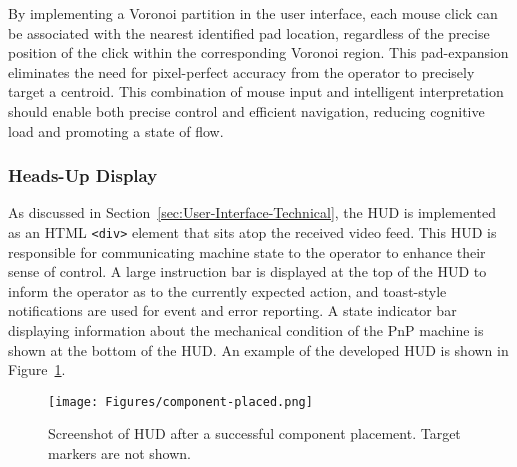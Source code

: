 \documentclass[12pt,british,UKenglish]{article}
\begin{document}
By implementing a Voronoi partition in the user interface, each mouse click can be associated with the nearest identified pad location, regardless of the precise position of the click within the corresponding Voronoi region.
This pad-expansion eliminates the need for pixel-perfect accuracy from the operator to precisely target a centroid.
This combination of mouse input and intelligent interpretation should enable both precise control and efficient navigation, reducing cognitive load and promoting a state of flow.

\subsubsection{Heads-Up Display}

As discussed in Section~\ref{sec:User-Interface-Technical}, the \ac{HUD} is implemented as an \ac{HTML} \texttt{<div>} element that sits atop the received video feed.
This \ac{HUD} is responsible for communicating machine state to the operator to enhance their sense of control.
A large instruction bar is displayed at the top of the \ac{HUD} to inform the operator as to the currently expected action, and toast-style notifications are used for event and error reporting.
A state indicator bar displaying information about the mechanical condition of the \ac{PnP} machine is shown at the bottom of the \ac{HUD}.
An example of the developed \ac{HUD} is shown in Figure~\ref{fig:component-placed}.
\begin{figure}[hbtp]
    \texttt{[image: Figures/component-placed.png]}
    \centering
    \caption{Screenshot of \acf{HUD} after a successful component placement. Target markers are not shown.}
    \label{fig:component-placed}
\end{figure}
\end{document}
